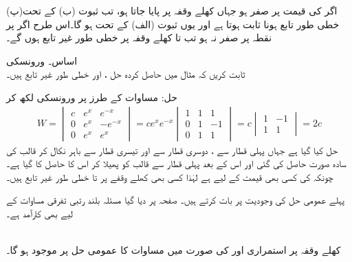 (پ)\quad اگر  کی قیمت  پر صفر ہو جہاں  کھلے وقفہ  پر پایا جاتا ہو، تب ثبوت (ب) کے تحت خطی طور تابع ہونا ثابت ہوتا ہے اور یوں ثبوت (الف) کے تحت  ہو گا۔اس طرح اگر  پر نقطہ  پر  صفر نہ ہو تب  تا  کھلے وقفہ  پر خطی طور غیر تابع ہوں گے۔

 \quad اساس۔ ورونسکی\\
ثابت کریں کہ مثال  میں حاصل کردہ حل ،  اور  خطی طور غیر تابع ہیں۔

حل: مساوات  کے طرز پر  ورونسکی لکھ کر
\begin{align*}
W=
\begin{vmatrix}
c& e^x& e^{-x}\\
0& e^x & -e^{-x}\\
0&e^x&e^x
\end{vmatrix}
=c e^{x} e^{-x}
\begin{vmatrix}
1& 1& 1\\
0& 1 & -1\\
0&1&1
\end{vmatrix}=
c
\begin{vmatrix}
1& -1\\
1&1
\end{vmatrix}
=2c
\end{align*}
حل کیا گیا ہے جہاں پہلی قطار سے ، دوسری قطار سے  اور تیسری قطار سے  باہر نکال کر قالب کی سادہ صورت حاصل کی گئی اور اس کے بعد پہلی قطار سے قالب کو پھیلا کر اس کا  حاصل کا گیا ہے۔چونکہ  کی کسی بھی قیمت کے لیے   ہے لہٰذا کسی بھی کھلے وقفے پر  تا  خطی طور غیر تابع ہیں۔

پہلے عمومی حل کی وجودیت پر بات کرتے ہیں۔ صفحہ  پر دیا گیا مسئلہ  بلند رتبی تفرقی مساوات کے لیے بھی کارآمد ہے۔

\\
کھلے وقفہ  پر استمراری  اور  کی صورت میں مساوات  کا عمومی حل  پر موجود ہو گا۔

